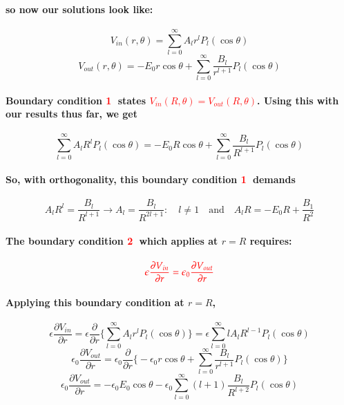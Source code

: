 \documentclass{article}
\begin{document}
\paragraph{so now our solutions look like:}
\begin{equation*}
    V_{in}(r,\theta)=\sum_{l=0}^{\infty} A_l r^l P_l(\cos\theta)
\end{equation*}
\begin{equation*}
    V_{out}(r,\theta)=-E_0 r \cos\theta +\sum_{l=0}^{\infty} \frac{B_l}{r^{l+1}}P_l(\cos\theta)
\end{equation*}
\paragraph{Boundary condition \textcolor{red}{\textcircled{1}} states \textcolor{red}{$V_{in}(R,\theta)=V_{out}(R,\theta)$}. Using this with our results thus far, we get}
\begin{equation*}
    \sum_{l=0}^{\infty}A_lR^lP_l(\cos\theta)=-E_0 R\cos\theta+\sum_{l=0}^{\infty}\frac{B_l}{R^{l+1}}P_l(\cos\theta)
\end{equation*}
\paragraph{So, with orthogonality, this boundary condition \textcolor{red}{\textcircled{1}} demands}
\begin{equation*}
    A_lR^l=\frac{B_l}{R^{l+1}}\rightarrow A_l=\frac{B_l}{R^{2l+1}}:\quad l\neq 1\quad \text{and} \quad A_l R=-E_0R+\frac{B_1}{R^2}
\end{equation*}
\paragraph{The boundary condition \textcolor{red}{\textcircled{2}} which applies at $r=R$ requires:}
\begin{equation*}
    \textcolor{red}{\epsilon\frac{\partial V_{in}}{\partial r}=\epsilon_0\frac{\partial V_{out}}{\partial r}}
\end{equation*}
\paragraph{Applying this boundary condition at $r=R$,}
\begin{equation*}
    \epsilon\frac{\partial V_{in}}{\partial r}=\epsilon\frac{\partial}{\partial r}\bigg\{ \sum_{l=0}^{\infty}A_lr^lP_l(\cos\theta)\bigg\}=\epsilon\sum_{l=0}^{\infty}lA_lR^{l-1}P_l(\cos\theta)
\end{equation*}
\begin{equation*}
    \epsilon_0\frac{\partial V_{out}}{\partial r}=\epsilon_0\frac{\partial}{\partial r}\bigg\{ -\epsilon_0 r\cos\theta +\sum_{l=0}^{\infty}\frac{B_l}{r^{l+1}}P_l(\cos\theta)\bigg\}
\end{equation*}
\begin{equation*}
    \epsilon_0\frac{\partial V_{out}}{\partial r}=-\epsilon_0E_0\cos\theta -\epsilon_0\sum_{l=0}^{\infty}(l+1)\frac{B_l}{R^{l+2}}P_l(\cos\theta)
\end{equation*}
\end{document}
